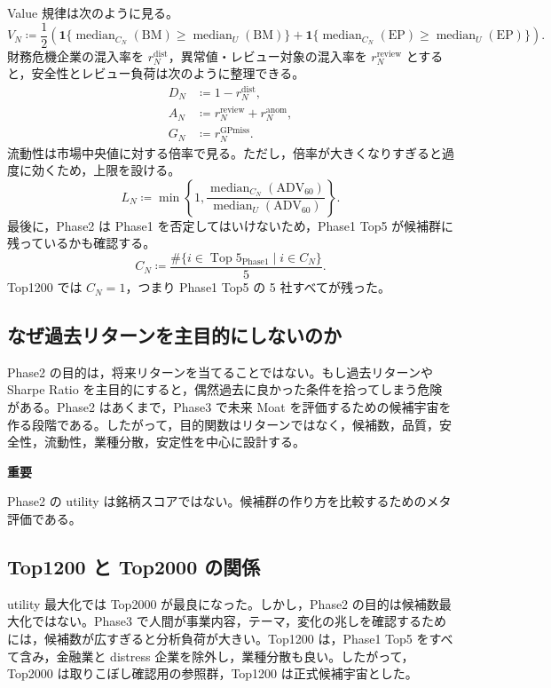 \documentclass[a4paper,10pt]{article}
\newcommand{\metric}[1]{\mathrm{#1}}
\newcommand{\ind}[1]{\mathbf{1}\{#1\}}
\newcommand{\Top}{\operatorname{Top}}
\newcommand{\median}{\operatorname{median}}
\begin{document}
Value 規律は次のように見る。
\begin{equation}
V_N \coloneqq \frac{1}{2}\left(\ind{\median_{C_N}(\metric{BM})\ge\median_U(\metric{BM})}+\ind{\median_{C_N}(\metric{EP})\ge\median_U(\metric{EP})}\right).
\end{equation}
財務危機企業の混入率を $r^{\mathrm{dist}}_N$，異常値・レビュー対象の混入率を $r^{\mathrm{review}}_N$ とすると，安全性とレビュー負荷は次のように整理できる。
\begin{align}
D_N &\coloneqq 1-r^{\mathrm{dist}}_N, \\
A_N &\coloneqq r^{\mathrm{review}}_N+r^{\mathrm{anom}}_N, \\
G_N &\coloneqq r^{\mathrm{GPmiss}}_N .
\end{align}
流動性は市場中央値に対する倍率で見る。ただし，倍率が大きくなりすぎると過度に効くため，上限を設ける。
\begin{equation}
L_N \coloneqq \min\left\{1,\frac{\median_{C_N}(\metric{ADV}_{60})}{\median_U(\metric{ADV}_{60})}\right\} .
\end{equation}
最後に，Phase2 は Phase1 を否定してはいけないため，Phase1 Top5 が候補群に残っているかも確認する。
\begin{equation}
C_N \coloneqq \frac{\#\{i\in \Top5_{\mathrm{Phase1}}\mid i\in C_N\}}{5} .
\end{equation}
Top1200 では $C_N=1$，つまり Phase1 Top5 の 5 社すべてが残った。

\subsection{なぜ過去リターンを主目的にしないのか}
Phase2 の目的は，将来リターンを当てることではない。もし過去リターンや Sharpe Ratio を主目的にすると，偶然過去に良かった条件を拾ってしまう危険がある。Phase2 はあくまで，Phase3 で未来 Moat を評価するための候補宇宙を作る段階である。したがって，目的関数はリターンではなく，候補数，品質，安全性，流動性，業種分散，安定性を中心に設計する。

\begin{definitionbox}
\textbf{重要}\par
Phase2 の utility は銘柄スコアではない。候補群の作り方を比較するためのメタ評価である。
\end{definitionbox}

\subsection{Top1200 と Top2000 の関係}
utility 最大化では Top2000 が最良になった。しかし，Phase2 の目的は候補数最大化ではない。Phase3 で人間が事業内容，テーマ，変化の兆しを確認するためには，候補数が広すぎると分析負荷が大きい。Top1200 は，Phase1 Top5 をすべて含み，金融業と distress 企業を除外し，業種分散も良い。したがって，Top2000 は取りこぼし確認用の参照群，Top1200 は正式候補宇宙とした。
\end{document}

